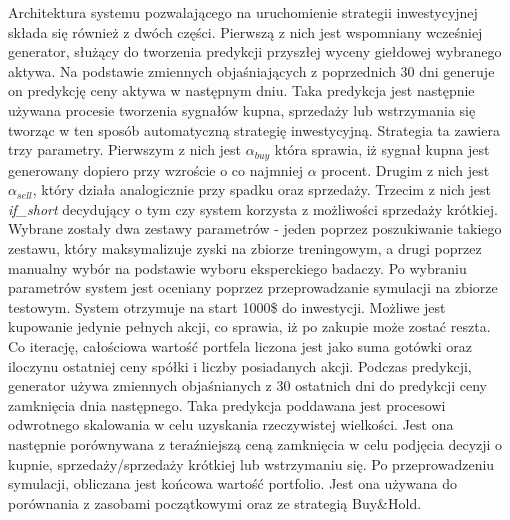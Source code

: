 \documentclass[review]{elsarticle} %
\begin{document}
Architektura systemu  pozwalającego na uruchomienie strategii inwestycyjnej składa się również z dwóch części. Pierwszą z nich jest wspomniany wcześniej generator, służący do tworzenia predykcji przyszłej wyceny giełdowej wybranego aktywa. Na podstawie zmiennych objaśniających z poprzednich 30 dni generuje on predykcję ceny aktywa w następnym dniu. Taka predykcja jest następnie używana procesie tworzenia sygnałów kupna, sprzedaży lub wstrzymania się tworząc w ten sposób automatyczną strategię inwestycyjną. Strategia ta zawiera trzy parametry. Pierwszym z nich jest $\alpha_{buy}$ która sprawia, iż sygnał kupna jest generowany dopiero przy wzroście o co najmniej $\alpha$ procent. Drugim z nich jest  $\alpha_{sell}$, który działa analogicznie przy spadku oraz sprzedaży. Trzecim z nich jest \textit{if\_short} decydujący o tym czy system korzysta z możliwości sprzedaży krótkiej. Wybrane zostały dwa zestawy parametrów - jeden poprzez poszukiwanie takiego zestawu, który maksymalizuje zyski na zbiorze treningowym, a drugi poprzez manualny wybór na podstawie wyboru eksperckiego badaczy. Po wybraniu parametrów system jest oceniany poprzez przeprowadzanie symulacji na zbiorze testowym. System otrzymuje na start 1000\$ do inwestycji. Możliwe jest kupowanie jedynie pełnych akcji, co sprawia, iż po zakupie może zostać reszta. Co iterację, całościowa wartość portfela liczona jest jako suma gotówki oraz iloczynu ostatniej ceny spółki i liczby posiadanych akcji.  Podczas predykcji, generator używa zmiennych objaśnianych z 30 ostatnich dni do predykcji ceny zamknięcia dnia następnego. Taka predykcja poddawana jest procesowi odwrotnego skalowania w celu uzyskania rzeczywistej wielkości. Jest ona następnie porównywana z teraźniejszą ceną zamknięcia w celu podjęcia decyzji o kupnie, sprzedaży/sprzedaży krótkiej lub wstrzymaniu się. Po przeprowadzeniu symulacji, obliczana jest końcowa wartość portfolio. Jest ona używana do porównania z zasobami początkowymi oraz ze strategią Buy\&Hold.
\end{document}
